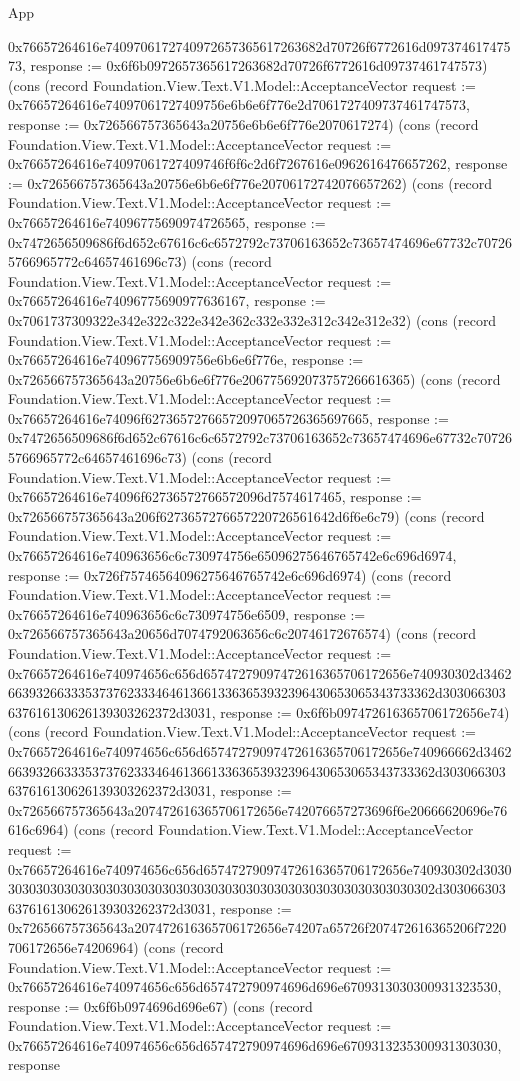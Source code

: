 \begin{lexlean}{App}
\begin{semanticmodule}
{0x76657264616e7409706172740972657365617263682d70726f6772616d09737461747573, response := 0x6f6b0972657365617263682d70726f6772616d09737461747573}) (cons (record Foundation.View.Text.V1.Model::AcceptanceVector {request := 0x76657264616e74097061727409756e6b6e6f776e2d7061727409737461747573, response := 0x726566757365643a20756e6b6e6f776e2070617274}) (cons (record Foundation.View.Text.V1.Model::AcceptanceVector {request := 0x76657264616e74097061727409746f6f6c2d6f7267616e0962616476657262, response := 0x726566757365643a20756e6b6e6f776e20706172742076657262}) (cons (record Foundation.View.Text.V1.Model::AcceptanceVector {request := 0x76657264616e74096775690974726565, response := 0x7472656509686f6d652c67616c6c6572792c73706163652c73657474696e67732c707265766965772c64657461696c73}) (cons (record Foundation.View.Text.V1.Model::AcceptanceVector {request := 0x76657264616e74096775690977636167, response := 0x7061737309322e342e322c322e342e362c332e332e312c342e312e32}) (cons (record Foundation.View.Text.V1.Model::AcceptanceVector {request := 0x76657264616e740967756909756e6b6e6f776e, response := 0x726566757365643a20756e6b6e6f776e206775692073757266616365}) (cons (record Foundation.View.Text.V1.Model::AcceptanceVector {request := 0x76657264616e74096f62736572766572097065726365697665, response := 0x7472656509686f6d652c67616c6c6572792c73706163652c73657474696e67732c707265766965772c64657461696c73}) (cons (record Foundation.View.Text.V1.Model::AcceptanceVector {request := 0x76657264616e74096f62736572766572096d7574617465, response := 0x726566757365643a206f6273657276657220726561642d6f6e6c79}) (cons (record Foundation.View.Text.V1.Model::AcceptanceVector {request := 0x76657264616e740963656c6c730974756e65096275646765742e6c696d6974, response := 0x726f75746564096275646765742e6c696d6974}) (cons (record Foundation.View.Text.V1.Model::AcceptanceVector {request := 0x76657264616e740963656c6c730974756e6509, response := 0x726566757365643a20656d7074792063656c6c20746172676574}) (cons (record Foundation.View.Text.V1.Model::AcceptanceVector {request := 0x76657264616e740974656c656d65747279097472616365706172656e740930302d34626639326633353737623334646136613363653932396430653065343733362d303066303637616130626139303262372d3031, response := 0x6f6b097472616365706172656e74}) (cons (record Foundation.View.Text.V1.Model::AcceptanceVector {request := 0x76657264616e740974656c656d65747279097472616365706172656e740966662d34626639326633353737623334646136613363653932396430653065343733362d303066303637616130626139303262372d3031, response := 0x726566757365643a207472616365706172656e742076657273696f6e20666620696e76616c6964}) (cons (record Foundation.View.Text.V1.Model::AcceptanceVector {request := 0x76657264616e740974656c656d65747279097472616365706172656e740930302d30303030303030303030303030303030303030303030303030303030303030302d303066303637616130626139303262372d3031, response := 0x726566757365643a207472616365706172656e74207a65726f207472616365206f7220706172656e74206964}) (cons (record Foundation.View.Text.V1.Model::AcceptanceVector {request := 0x76657264616e740974656c656d657472790974696d696e6709313030300931323530, response := 0x6f6b0974696d696e67}) (cons (record Foundation.View.Text.V1.Model::AcceptanceVector {request := 0x76657264616e740974656c656d657472790974696d696e6709313235300931303030, response }
\end{semanticmodule}
\end{lexlean}
